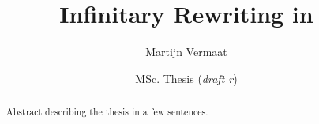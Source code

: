 \documentclass[oneside,draft]{vu}
\title{Infinitary Rewriting in \Coq}
\author{Martijn Vermaat}
\date{MSc. Thesis (\emph{draft r\svnrev})}
\begin{document}
\maketitle

\begin{abstract}
  Abstract describing the thesis in a few sentences.
\end{abstract}




\tableofcontents







\pagebreak

\nocite{*}


\end{document}

